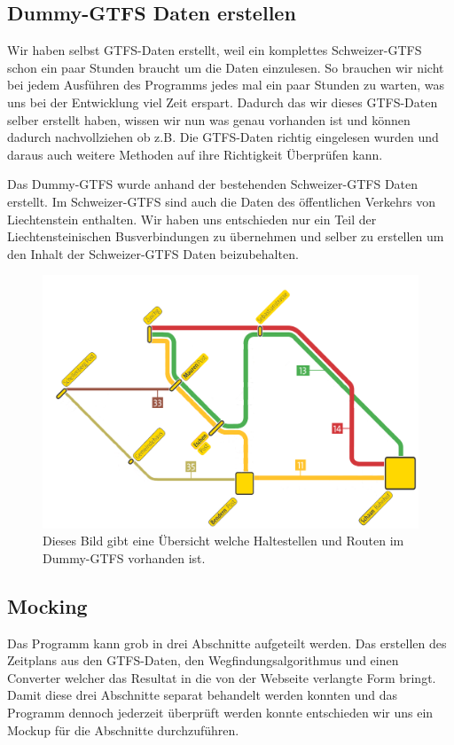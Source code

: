 
\subsection{Dummy-GTFS Daten erstellen}
Wir haben selbst GTFS-Daten erstellt, weil ein komplettes Schweizer-GTFS schon ein paar Stunden braucht um die Daten einzulesen. So brauchen wir nicht bei jedem Ausführen des Programms jedes mal ein paar Stunden zu warten, was uns bei der Entwicklung viel Zeit erspart. Dadurch das wir dieses GTFS-Daten selber erstellt haben, wissen wir nun was genau vorhanden ist und können dadurch nachvollziehen ob z.B. Die GTFS-Daten richtig eingelesen wurden und daraus auch weitere Methoden auf ihre Richtigkeit Überprüfen kann.\newline

Das Dummy-GTFS wurde anhand der bestehenden Schweizer-GTFS Daten erstellt. Im Schweizer-GTFS sind auch die Daten des öffentlichen Verkehrs von Liechtenstein enthalten. Wir haben uns entschieden nur ein Teil der Liechtensteinischen Busverbindungen zu übernehmen und selber zu erstellen um den Inhalt der Schweizer-GTFS Daten beizubehalten.

\begin{figure}[h]
	\centering
	\includegraphics[width=12cm]{img/LiniennetzDummyGTFS.png}
	\caption{Dieses Bild gibt eine Übersicht welche Haltestellen und Routen im Dummy-GTFS vorhanden ist.}
	\label{fig:DummyGTFS-uebersicht}
\end{figure}




\subsection{Mocking}
Das Programm kann grob in drei Abschnitte aufgeteilt werden. Das erstellen des Zeitplans aus den GTFS-Daten, den Wegfindungsalgorithmus und einen Converter welcher das Resultat in die von der Webseite verlangte Form bringt. Damit diese drei Abschnitte separat behandelt werden konnten und das Programm dennoch jederzeit überprüft werden konnte entschieden wir uns ein Mockup für die Abschnitte durchzuführen.

